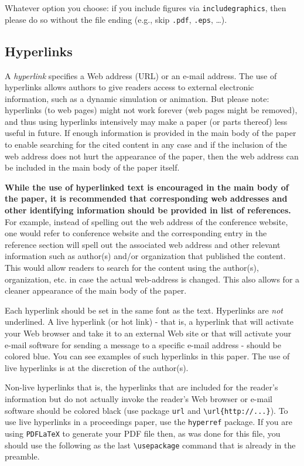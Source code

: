 \documentclass{scspaperproc}
\theoremstyle{scsthe}
\begin{document}
Whatever option you choose: if you include figures via \texttt{includegraphics}, then please do so without the file ending (e.g., skip \texttt{.pdf}, \texttt{.eps}, \ldots).


\subsection{Hyperlinks}
\label{sec:hyper}

A \emph{hyperlink} specifies a Web address (URL) or an e-mail address. The use of hyperlinks allows authors to give readers access to external electronic information, such as a dynamic simulation or animation. 
But please note: hyperlinks (to web pages) might not work forever (web pages might be removed), and thus using hyperlinks intensively may make a paper (or parts thereof) less useful in future. If enough information is provided in the main body of the paper to enable searching for the cited content in any case and if the inclusion of the web address does not hurt the appearance of the paper, then the web address can be included in the main body of the paper itself.

\textbf{While the use of hyperlinked text is encouraged in the main body of the paper, it is recommended that corresponding web addresses and other identifying information should be provided in list of references.} For example, instead of spelling out the web address of the conference website, one would refer to conference website and the corresponding entry in the reference section will spell out the associated web address and other relevant information such as author(s) and/or organization that published the content. This would allow readers to search for the content using the author(s), organization, etc. in case the actual web-address is changed. This also allows for a cleaner appearance of the main body of the paper.

Each hyperlink should be set in the same font as the text. Hyperlinks are \emph{not} underlined. A live hyperlink (or hot link) - that is, a hyperlink that will activate your Web browser and take it to an external Web site or that will activate your e-mail software for sending a message to a specific e-mail address - should be colored blue. You can see examples of such hyperlinks in this paper. The use of live hyperlinks is at the discretion of the author(s).

Non-live hyperlinks that is, the hyperlinks that are included for the reader’s information but do not actually invoke the reader’s Web browser or e-mail software should be colored black (use package \texttt{url} and \verb+\url{http://...}+). To use live hyperlinks in a proceedings paper, use the \texttt{hyperref} package. If you are using \texttt{PDFLaTeX} to generate your PDF file then, as was done for this file, you should use the following as the last \verb+\usepackage+ command that is already in the preamble.
\end{document}
